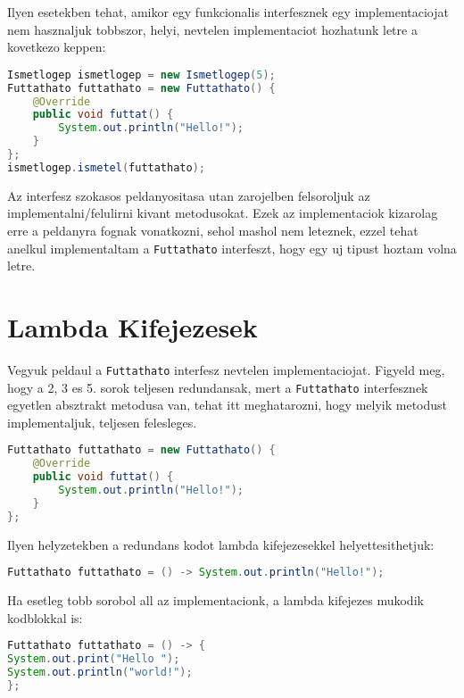 \documentclass{article}
\let\l\lstinline
\begin{document}
    Ilyen esetekben tehat, amikor egy funkcionalis interfesznek egy implementaciojat nem hasznaljuk tobbszor, helyi, nevtelen implementaciot hozhatunk letre a kovetkezo keppen:

    \begin{lstlisting}[language=Java, caption=Futtathato interfesz nevtelen implementacioja]
Ismetlogep ismetlogep = new Ismetlogep(5);
Futtathato futtathato = new Futtathato() {
    @Override
    public void futtat() {
        System.out.println("Hello!");
    }
};
ismetlogep.ismetel(futtathato);
    \end{lstlisting}

    Az interfesz szokasos peldanyositasa utan zarojelben felsoroljuk az implementalni/felulirni kivant metodusokat. Ezek az implementaciok kizarolag erre a peldanyra fognak vonatkozni, sehol mashol nem leteznek, ezzel tehat anelkul implementaltam a \l{Futtathato} interfeszt, hogy egy uj tipust hoztam volna letre.

    \newpage


    \section{Lambda Kifejezesek}

    Vegyuk peldaul a \l{Futtathato} interfesz nevtelen implementaciojat. Figyeld meg, hogy a 2, 3 es 5. sorok teljesen redundansak, mert a \l{Futtathato} interfesznek egyetlen absztrakt metodusa van, tehat itt meghatarozni, hogy melyik metodust implementaljuk, teljesen felesleges.

    \begin{lstlisting}[language=Java, caption=Futtathato interfesz nevtelen implementacioja]
Futtathato futtathato = new Futtathato() {
    @Override
    public void futtat() {
        System.out.println("Hello!");
    }
};
    \end{lstlisting}

    Ilyen helyzetekben a redundans kodot lambda kifejezesekkel helyettesithetjuk:

    \begin{lstlisting}[language=Java, caption=Egysoros lambda kifejezes]
Futtathato futtathato = () -> System.out.println("Hello!");
    \end{lstlisting}

    Ha esetleg tobb sorobol all az implementacionk, a lambda kifejezes mukodik kodblokkal is:

    \begin{lstlisting}[language=Java, caption=Lambda kifejezes kodblokkal]
Futtathato futtathato = () -> {
System.out.print("Hello ");
System.out.println("world!");
};
    \end{lstlisting}
\end{document}
